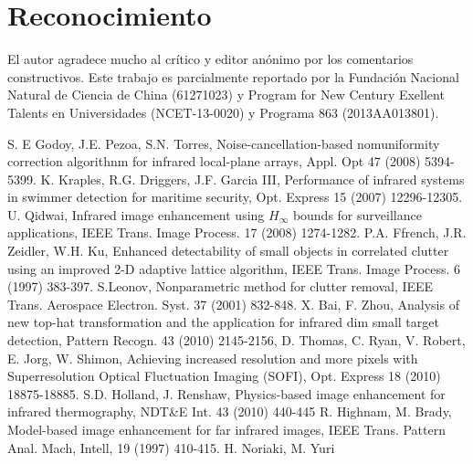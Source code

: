 \documentclass[a4paper, 11 pt, conference]{ieeeconf}      %
\begin{document}
\section*{\textbf{Reconocimiento}}

El autor agradece mucho al cr\'itico y editor an\'onimo por los comentarios constructivos. Este trabajo es parcialmente reportado por la Fundaci\'on Nacional Natural de Ciencia de China (61271023) y Program for New Century Exellent Talents en Universidades (NCET-13-0020) y Programa 863 (2013AA013801).
\begin{thebibliography}{99}

 S. E Godoy, J.E. Pezoa, S.N. Torres, Noise-cancellation-based nomuniformity correction algorithnm for infrared local-plane arrays, Appl. Opt 47 (2008) 5394-5399.
 K. Kraples, R.G. Driggers, J.F. Garcia III, Performance of infrared systems in swimmer detection for maritime security, Opt. Express 15 (2007) 12296-12305.
 U. Qidwai, Infrared image enhancement using $H_\infty$ bounds for surveillance applications, IEEE Trans. Image Process. 17 (2008) 1274-1282.
 P.A. Ffrench, J.R. Zeidler, W.H. Ku, Enhanced detectability of small objects in correlated clutter using an improved 2-D adaptive lattice algorithm, IEEE Trans. Image Process. 6 (1997) 383-397.
 S.Leonov, Nonparametric method for clutter removal, IEEE Trans. Aerospace Electron. Syst. 37 (2001) 832-848.
 X. Bai, F. Zhou, Analysis of new top-hat transformation and the application for infrared dim small target detection, Pattern Recogn. 43 (2010) 2145-2156,
 D. Thomas, C. Ryan, V. Robert, E. Jorg, W. Shimon, Achieving increased resolution and more pixels with Superresolution Optical Fluctuation Imaging (SOFI), Opt. Express 18 (2010) 18875-18885.
 S.D. Holland, J. Renshaw, Physics-based image enhancement for infrared thermography, NDT&E Int. 43 (2010) 440-445
 R. Highnam, M. Brady, Model-based image enhancement for far infrared images, IEEE Trans. Pattern Anal. Mach, Intell,  19 (1997) 410-415.
 H. Noriaki, M. Yuri

\end{thebibliography}
\end{document}
